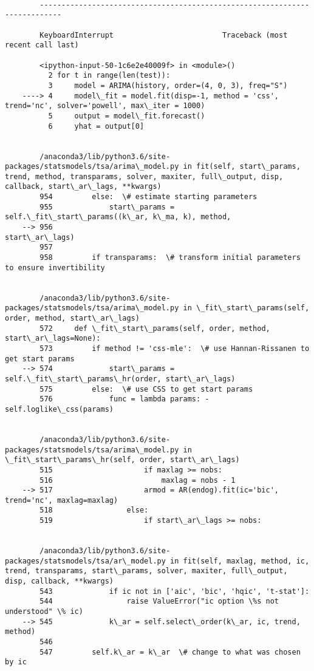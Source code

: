 \documentclass[11pt]{article}
\begin{document}
    \begin{Verbatim}[commandchars=\\\{\}]

        ---------------------------------------------------------------------------

        KeyboardInterrupt                         Traceback (most recent call last)

        <ipython-input-50-1c6e2e40009f> in <module>()
          2 for t in range(len(test)):
          3     model = ARIMA(history, order=(4, 0, 3), freq="S")
    ----> 4     model\_fit = model.fit(disp=-1, method = 'css', trend='nc', solver='powell', max\_iter = 1000)
          5     output = model\_fit.forecast()
          6     yhat = output[0]


        /anaconda3/lib/python3.6/site-packages/statsmodels/tsa/arima\_model.py in fit(self, start\_params, trend, method, transparams, solver, maxiter, full\_output, disp, callback, start\_ar\_lags, **kwargs)
        954         else:  \# estimate starting parameters
        955             start\_params = self.\_fit\_start\_params((k\_ar, k\_ma, k), method,
    --> 956                                                   start\_ar\_lags)
        957 
        958         if transparams:  \# transform initial parameters to ensure invertibility


        /anaconda3/lib/python3.6/site-packages/statsmodels/tsa/arima\_model.py in \_fit\_start\_params(self, order, method, start\_ar\_lags)
        572     def \_fit\_start\_params(self, order, method, start\_ar\_lags=None):
        573         if method != 'css-mle':  \# use Hannan-Rissanen to get start params
    --> 574             start\_params = self.\_fit\_start\_params\_hr(order, start\_ar\_lags)
        575         else:  \# use CSS to get start params
        576             func = lambda params: -self.loglike\_css(params)


        /anaconda3/lib/python3.6/site-packages/statsmodels/tsa/arima\_model.py in \_fit\_start\_params\_hr(self, order, start\_ar\_lags)
        515                     if maxlag >= nobs:
        516                         maxlag = nobs - 1
    --> 517                     armod = AR(endog).fit(ic='bic', trend='nc', maxlag=maxlag)
        518                 else:
        519                     if start\_ar\_lags >= nobs:


        /anaconda3/lib/python3.6/site-packages/statsmodels/tsa/ar\_model.py in fit(self, maxlag, method, ic, trend, transparams, start\_params, solver, maxiter, full\_output, disp, callback, **kwargs)
        543             if ic not in ['aic', 'bic', 'hqic', 't-stat']:
        544                 raise ValueError("ic option \%s not understood" \% ic)
    --> 545             k\_ar = self.select\_order(k\_ar, ic, trend, method)
        546 
        547         self.k\_ar = k\_ar  \# change to what was chosen by ic



\end{Verbatim}
\end{document}
